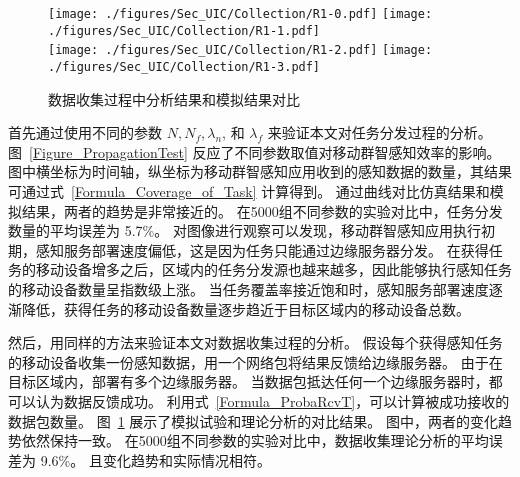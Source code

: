 \begin{figure}[!h]
  \centering
  {\texttt{[image: ./figures/Sec\_UIC/Collection/R1-0.pdf]}}
  {\texttt{[image: ./figures/Sec\_UIC/Collection/R1-1.pdf]}}\\
  {\texttt{[image: ./figures/Sec\_UIC/Collection/R1-2.pdf]}}
  {\texttt{[image: ./figures/Sec\_UIC/Collection/R1-3.pdf]}}
  \vspace{-0.5em}
  \caption{数据收集过程中分析结果和模拟结果对比}
  \vspace{-2em}
  \label{Figure_CollectionTest}
\end{figure}

首先通过使用不同的参数 $N, N_f, \lambda_n$, 和 $\lambda_f$ 来验证本文对任务分发过程的分析。
图~\ref{Figure_PropagationTest} 反应了不同参数取值对移动群智感知效率的影响。
图中横坐标为时间轴，纵坐标为移动群智感知应用收到的感知数据的数量，其结果可通过式~\eqref{Formula_Coverage_of_Task} 计算得到。
通过曲线对比仿真结果和模拟结果，两者的趋势是非常接近的。
在5000组不同参数的实验对比中，任务分发数量的平均误差为 5.7\%。
对图像进行观察可以发现，移动群智感知应用执行初期，感知服务部署速度偏低，这是因为任务只能通过边缘服务器分发。
在获得任务的移动设备增多之后，区域内的任务分发源也越来越多，因此能够执行感知任务的移动设备数量呈指数级上涨。
当任务覆盖率接近饱和时，感知服务部署速度逐渐降低，获得任务的移动设备数量逐步趋近于目标区域内的移动设备总数。




然后，用同样的方法来验证本文对数据收集过程的分析。
假设每个获得感知任务的移动设备收集一份感知数据，用一个网络包将结果反馈给边缘服务器。
由于在目标区域内，部署有多个边缘服务器。
当数据包抵达任何一个边缘服务器时，都可以认为数据反馈成功。
利用式~\eqref{Formula_ProbaRcvT}，可以计算被成功接收的数据包数量。
图~\ref{Figure_CollectionTest} 展示了模拟试验和理论分析的对比结果。
图中，两者的变化趋势依然保持一致。
在5000组不同参数的实验对比中，数据收集理论分析的平均误差为 9.6\%。
且变化趋势和实际情况相符。

